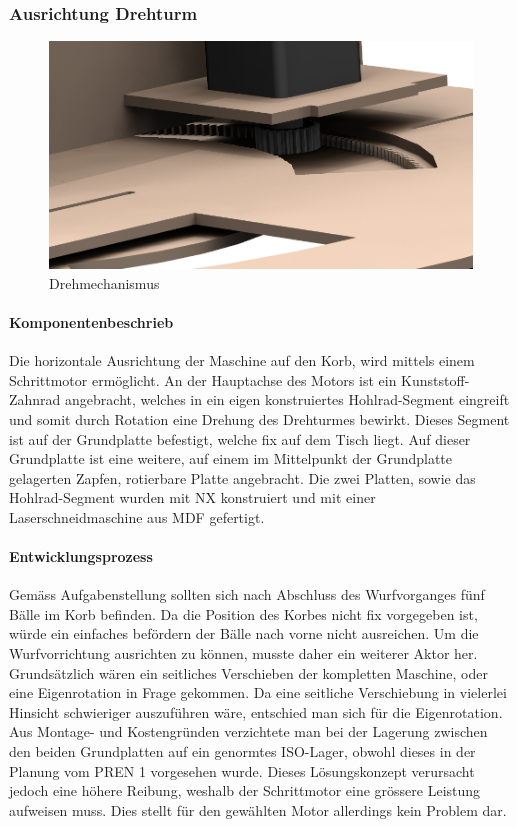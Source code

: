 \subsubsection{Ausrichtung Drehturm}
\begin{figure}[h!]
	\centering
	\includegraphics[width=\linewidth]{../../fig/Drehmechanismus}
	\caption{Drehmechanismus}
	\label{fig:Drehmechanismus}
\end{figure}
\paragraph{Komponentenbeschrieb}
Die horizontale Ausrichtung der Maschine auf den Korb, wird mittels einem Schrittmotor ermöglicht. An der Hauptachse des Motors ist ein Kunststoff-Zahnrad angebracht, welches in ein eigen konstruiertes Hohlrad-Segment eingreift und somit durch Rotation eine Drehung des Drehturmes bewirkt. Dieses Segment ist auf der Grundplatte befestigt, welche fix auf dem Tisch liegt. Auf dieser Grundplatte ist eine weitere, auf einem im Mittelpunkt der Grundplatte gelagerten Zapfen, rotierbare Platte angebracht. Die zwei Platten, sowie das Hohlrad-Segment wurden mit NX konstruiert und mit einer Laserschneidmaschine aus MDF gefertigt.

\paragraph{Entwicklungsprozess}
Gemäss Aufgabenstellung sollten sich nach Abschluss des Wurfvorganges fünf Bälle im Korb befinden. Da die Position des Korbes nicht fix vorgegeben ist, würde ein einfaches befördern der Bälle nach vorne nicht ausreichen. Um die Wurfvorrichtung ausrichten zu können, musste daher ein weiterer Aktor her. Grundsätzlich wären ein seitliches Verschieben der kompletten Maschine, oder eine Eigenrotation in Frage gekommen. Da eine seitliche Verschiebung in vielerlei Hinsicht schwieriger auszuführen wäre, entschied man sich für die Eigenrotation. Aus Montage- und Kostengründen verzichtete man bei der Lagerung zwischen den beiden Grundplatten auf ein genormtes ISO-Lager, obwohl dieses in der Planung vom PREN 1 vorgesehen wurde. Dieses Lösungskonzept verursacht jedoch eine höhere Reibung, weshalb der Schrittmotor eine grössere Leistung aufweisen muss. Dies stellt für den gewählten Motor allerdings kein Problem dar.